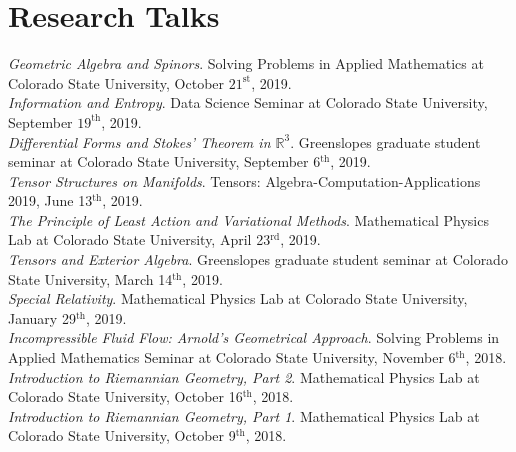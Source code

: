 \documentclass[12pt]{article} %
\begin{document}
\section{Research Talks}
\begin{flushleft}
    \emph{Geometric Algebra and Spinors}. Solving Problems in Applied Mathematics at Colorado State University, October $21^\textrm{st}$, 2019.\\
    \vspace*{5pt}
    \emph{Information and Entropy}. Data Science Seminar at Colorado State University, September $19^{\textrm{th}}$, 2019.
    \\
    \vspace*{5pt}
    \emph{Differential Forms and Stokes' Theorem in $\mathbb{R}^3$}. Greenslopes graduate student seminar at Colorado State University, September 6$^\textrm{th}$, 2019.
    \\
    \vspace*{5pt}
    \emph{Tensor Structures on Manifolds}. Tensors: Algebra-Computation-Applications 2019, June 13$^\textrm{th}$, 2019. \\
    \vspace*{5pt}
    \emph{The Principle of Least Action and Variational Methods}. Mathematical Physics Lab at Colorado State University, April 23$^\textrm{rd}$, 2019. \\
    \vspace*{5pt}
    \emph{Tensors and Exterior Algebra}. Greenslopes graduate student seminar at Colorado State University, March 14$^\textrm{th}$, 2019.\\
    \vspace*{5pt}
    \emph{Special Relativity}. Mathematical Physics Lab at Colorado State University, January 29$^\textrm{th}$, 2019.\\
    \vspace*{5pt}
    \emph{Incompressible Fluid Flow: Arnold's Geometrical Approach}. Solving Problems in Applied Mathematics Seminar at Colorado State University, November 6$^\textrm{th}$, 2018.\\
    \vspace*{5pt}
    \emph{Introduction to Riemannian Geometry, Part 2}. Mathematical Physics Lab at Colorado State University, October 16$^\textrm{th}$, 2018.\\
    \vspace*{5pt}
    \emph{Introduction to Riemannian Geometry, Part 1}. Mathematical Physics Lab at Colorado State University, October 9$^\textrm{th}$, 2018.
\end{flushleft}
\end{document}
